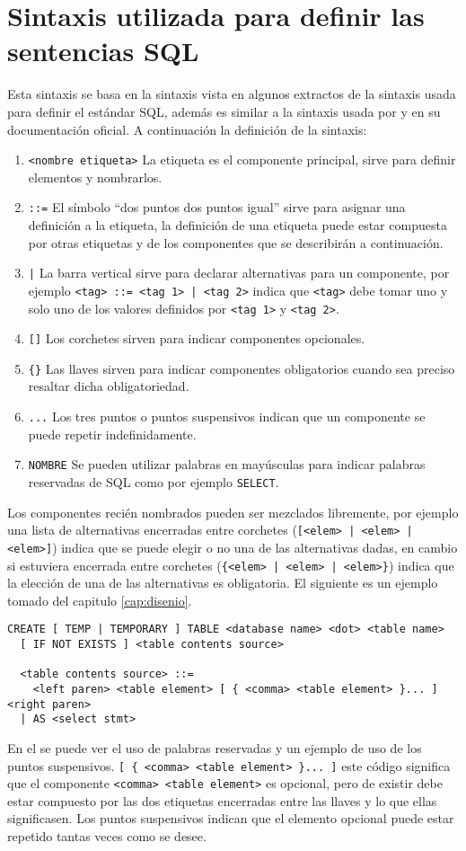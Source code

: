\section{Sintaxis utilizada para definir las sentencias SQL}
Esta sintaxis se basa en la sintaxis vista en algunos extractos de la sintaxis usada para definir el estándar SQL, además es similar a la sintaxis usada por \p y \m en su documentación oficial. A continuación la definición de la sintaxis:
\begin{enumerate}
\item \verb=<nombre etiqueta>= La etiqueta es el componente principal, sirve para definir elementos y nombrarlos.
%
\item \verb|::=| El símbolo ``dos puntos dos puntos igual'' sirve para asignar una definición a la etiqueta, la definición de una etiqueta puede estar compuesta por otras etiquetas y de los componentes que se describirán a continuación.
%
\item \verb=|= La barra vertical sirve para declarar alternativas para un componente, por ejemplo \verb(<tag> ::= <tag 1> | <tag 2>( indica que \verb=<tag>= debe tomar uno y solo uno de los valores definidos por \verb=<tag 1>= y \verb=<tag 2>=.
%
\item \verb=[]= Los corchetes sirven para indicar componentes opcionales.
%
\item \verb={}= Las llaves sirven para indicar componentes obligatorios cuando sea preciso resaltar dicha obligatoriedad.
%
\item \verb=...= Los tres puntos o puntos suspensivos indican que un componente se puede repetir indefinidamente.
%
\item \verb=NOMBRE= Se pueden utilizar palabras en mayúsculas para indicar palabras reservadas de SQL como por ejemplo \verb=SELECT=.
\end{enumerate}
%
Los componentes recién nombrados pueden ser mezclados libremente, por ejemplo una lista de alternativas encerradas entre corchetes (\verb=[<elem> | <elem> | <elem>]=) indica que se puede elegir o no una de las alternativas dadas, en cambio si estuviera encerrada entre corchetes (\verb={<elem> | <elem> | <elem>}=) indica que la elección de una de las alternativas es obligatoria. El siguiente es un ejemplo tomado del capitulo \ref{cap:disenio}.
%
\begin{Verbatim}[frame=leftline, framesep=3mm]
  CREATE [ TEMP | TEMPORARY ] TABLE <database name> <dot> <table name> 
  [ IF NOT EXISTS ] <table contents source>

  <table contents source> ::=
    <left paren> <table element> [ { <comma> <table element> }... ] <right paren>
  | AS <select stmt>
\end{Verbatim}
%
En el se puede ver el uso de palabras reservadas y un ejemplo de uso de los puntos suspensivos. \verb=[ { <comma> <table element> }... ]= este código significa que el componente \verb=<comma> <table element>= es opcional, pero de existir debe estar compuesto por las dos etiquetas encerradas entre las llaves y lo que ellas significasen. Los puntos suspensivos indican que el elemento opcional puede estar repetido tantas veces como se desee. 